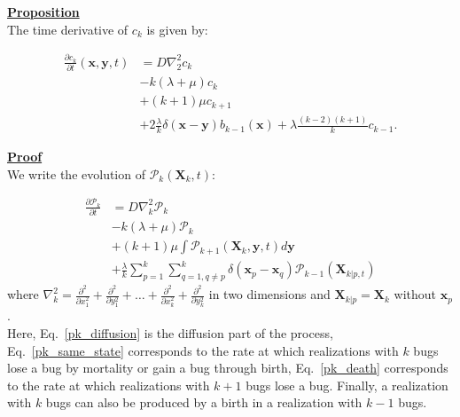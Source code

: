 \newpage
\textbf{\underline{Proposition}}\\

The time derivative of $c_k$ is given by:

\begin{subequations} 
\begin{align}
\frac{\partial c_{k}}{\partial t}(\boldsymbol{x},\boldsymbol{y},t) & =D\nabla_{2}^{2}c_{k}\label{ck_diffusion-1}\\
 & -k(\lambda+\mu)c_{k}\label{ck_same_state-1}\\
 & +(k+1)\mu c_{k+1}\label{ck_death-1}\\
 & +2\frac{\lambda}{k}\delta(\boldsymbol{x}-\boldsymbol{y})b_{k-1}(\boldsymbol{x})+\lambda\frac{(k-2)(k+1)}{k}c_{k-1}.\label{ck_birth-1}
\end{align}
\end{subequations}

\textbf{\underline{Proof}}\\

We write the evolution of $\mathcal{P}_{k}(\boldsymbol{X}_{k},t)$:

\begin{subequations} 
\begin{align}
\frac{\partial\mathcal{P}_{k}}{\partial t} & =D\nabla_{k}^{2}\mathcal{P}_{k}\label{pk_diffusion}\\
 & -k(\lambda+\mu)\mathcal{P}_{k}\label{pk_same_state}\\
 & +(k+1)\mu\int\mathcal{P}_{k+1}(\boldsymbol{X}_{k},\boldsymbol{y},t)d\boldsymbol{y}\label{pk_death}\\
 & +\frac{\lambda}{k}\sum_{p=1}^{k}\sum_{q=1,q\neq p}^{k}\delta({\boldsymbol{x}_p-\boldsymbol{x}_q})\mathcal{P}_{k-1}(\boldsymbol{X}_{k|p,t})\label{pk_birth}
\end{align}
\end{subequations}
where $\nabla_{k}^{2}=\frac{\partial^{2}}{\partial x_{1}^{2}}+\frac{\partial^{2}}{\partial y_{1}^{2}}+\ldots+\frac{\partial^{2}}{\partial x_{k}^{2}}+\frac{\partial^{2}}{\partial y_{k}^{2}}$ in two dimensions and $\boldsymbol{X}_{k|p}=\boldsymbol{X}_{k}$
without $\boldsymbol{x}_{p}$. \\

Here, Eq.~\ref{pk_diffusion} is the diffusion part of the process, 
Eq.~\ref{pk_same_state} corresponds to the rate at which realizations with $k$ bugs lose a bug by mortality or gain a bug through birth,  Eq.~\ref{pk_death} corresponds to the rate at which realizations with $k+1$ bugs lose a bug. Finally, a realization with $k$ bugs can also be produced by a birth in a realization with $k-1$ bugs. \\

